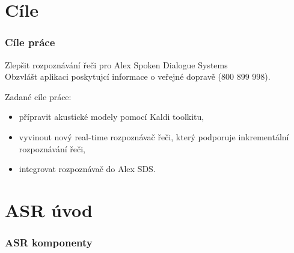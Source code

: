 

\maketitle


\section{Cíle} %

\begin{frame}\frametitle{Cíle práce} 
    Zlepšit rozpoznávání řeči pro Alex Spoken Dialogue Systems \\
    Obzvlášt aplikaci poskytujcí informace o veřejné dopravě (800 899 998).
        \begin{exampleblock}{Zadané cíle práce:}
        \begin{itemize}
            \item přípravit akustické modely pomocí Kaldi toolkitu,
            \item vyvinout nový real-time rozpoznávač řeči, který podporuje inkrementální rozpoznávání řeči,
            \item integrovat rozpoznávač do Alex SDS.
        \end{itemize}
    \end{exampleblock}
\end{frame}


\section{ASR úvod} %

\begin{frame}\frametitle{ASR komponenty} 
    
\end{frame}

